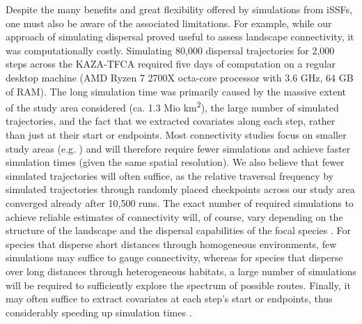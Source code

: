 \documentclass[../FinalThesis.tex]{subfiles}
\begin{document}

Despite the many benefits and great flexibility offered by simulations from
iSSFs, one must also be aware of the associated limitations. For example, while
our approach of simulating dispersal proved useful to assess landscape
connectivity, it was computationally costly. Simulating 80,000 dispersal
trajectories for 2,000 steps across the KAZA-TFCA required five days of
computation on a regular desktop machine (AMD Ryzen 7 2700X octa-core processor
with 3.6 GHz, 64 GB of RAM). The long simulation time was primarily caused by
the massive extent of the study area considered (ca. 1.3 Mio
km\textsuperscript{2}), the large number of simulated trajectories, and the fact
that we extracted covariates along each step, rather than just at their start or
endpoints. Most connectivity studies focus on smaller study areas (e.g.
\citealp{Kanagaraj.2013, Clark.2015, McClure.2016, Abrahms.2017, Zeller.2020})
and will therefore require fewer simulations and achieve faster simulation times
(given the same spatial resolution). We also believe that fewer simulated
trajectories will often suffice, as the relative traversal frequency by
simulated trajectories through randomly placed checkpoints across our study area
converged already after 10,500 runs. The exact number of required simulations to
achieve reliable estimates of connectivity will, of course, vary depending on
the structure of the landscape and the dispersal capabilities of the focal
species \citep{Gustafson.1996}. For species that disperse short distances
through homogeneous environments, few simulations may suffice to gauge
connectivity, whereas for species that disperse over long distances through
heterogeneous habitats, a large number of simulations will be required to
sufficiently explore the spectrum of possible routes. Finally, it may often
suffice to extract covariates at each step's start or endpoints, thus
considerably speeding up simulation times \citep{Signer.2017}.
\end{document}

